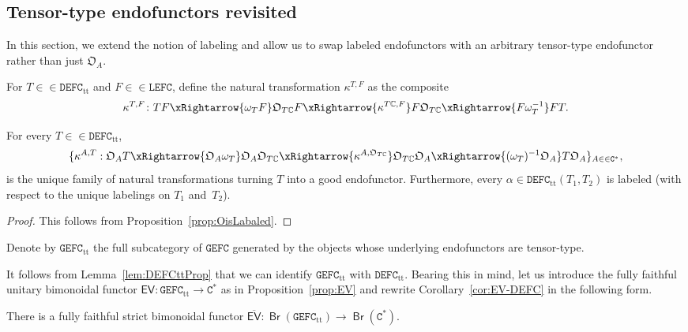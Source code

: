\documentclass[10pt]{simplearticle}
\newcommand{\GEFC}{\mathbb{\mathtt{GEFC}}}
\newcommand{\DEFC}{\mathbb{\mathtt{DEFC}}}
\newcommand{\LEFC}{\mathbb{\mathtt{LEFC}}}
\newcommand{\Cstar}{\mathtt{C^{*}}}
\newcommand{\mathsb}[1]{\boldsymbol{\mathsf{#1}}}
\newcommand{\Br}{\operatorname{\mathsb{Br}}}
\newcommand{\EV}{\mathsb{EV}}
\newcommand{\ttt}{\operatorname{tt}}
\begin{document}
\subsection{Tensor-type endofunctors revisited}

In this section, we extend the notion of labeling and allow us to
swap labeled endofunctors with an arbitrary tensor-type endofunctor
rather than just $\mathfrak{O}_{A}$.
\begin{defn}\label{def:kappaTT}
For $T\in\in\DEFC_{\ttt}$ and $F\in\in\LEFC$,
define the natural transformation $\kappa^{T,F}$ as the composite
\begin{equation}
\kappa^{T,F}\colon TF\xRightarrow{\omega_{T}F}\mathfrak{O}_{T\mathbb{C}}F\xRightarrow{\kappa^{T\mathbb{C},F}}F\mathfrak{O}_{T\mathbb{C}}\xRightarrow{F\omega^{-1}_{T}}FT.\label{eq:kappa37}
\end{equation}
\end{defn}

\begin{lem}\label{lem:DEFCttProp}
For every $T\in\in\DEFC_{\ttt}$,
\[
\{\kappa^{A,T}:\mathfrak{O}_{A}T\xRightarrow{\mathfrak{O}_{A}\omega_{T}}\mathfrak{O}_{A}\mathfrak{O}_{T\mathbb{C}}\xRightarrow{\kappa^{A,\mathfrak{O}_{T\mathbb{C}}}}\mathfrak{O}_{T\mathbb{C}}\mathfrak{O}_{A}\xRightarrow{(\omega_{T})^{-1}\mathfrak{O}_{A}}T\mathfrak{O}_{A}\}_{A\in\in\Cstar},
\]
is the unique family of natural transformations turning $T$ into
a good endofunctor. Furthermore, every $\alpha\in\DEFC_{\ttt}(T_{1},T_{2})$
is labeled (with respect to the unique labelings on $T_{1}$ and~$T_{2}$).
\end{lem}

\begin{proof}
This follows from Proposition~\ref{prop:OisLabaled}.
\end{proof}

\begin{defn}\label{def:GEFCtt}
Denote by $\GEFC_{\ttt}$ the full subcategory
of $\GEFC$ generated by the objects whose underlying endofunctors
are
tensor-type.
\end{defn}

It follows from Lemma~\ref{lem:DEFCttProp} that we can identify
$\GEFC_{\ttt}$ with $\DEFC_{\ttt}$. Bearing this in mind, let us
introduce the fully faithful unitary bimonoidal functor $\EV\colon\GEFC_{\ttt}\to\Cstar$
as in Proposition~\ref{prop:EV} and rewrite Corollary~\ref{cor:EV-DEFC}
in the following form.
\begin{cor}\label{cor:EV-GEFC}
There is a fully faithful strict bimonoidal functor
$\overline{\EV}\colon\Br(\GEFC_{\ttt})\to\Br(\Cstar)$.
\end{cor}
\end{document}
